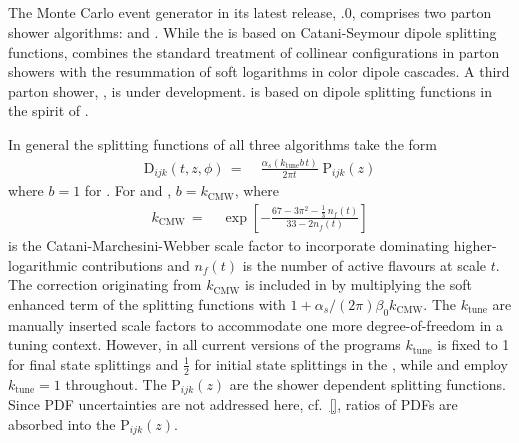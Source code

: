 \subsection{\Sherpa}
\label{sec:psunc:tools:sherpa}

The \Sherpa Monte Carlo event generator \cite{Gleisberg:2008ta} in its latest
release, .0, comprises two parton shower algorithms: \CSS
\cite{Schumann:2007mg} and \Dire \cite{Hoche:2015sya}. While the \CSS is based on
Catani-Seymour \cite{Catani:1996vz,Catani:2002hc} dipole splitting functions,
\Dire combines the standard treatment of collinear configurations in parton
showers with the resummation of soft logarithms in color dipole cascades. A
third parton shower, \Ants \cite{ants}, is under development. \Ants is based on
dipole splitting functions in the spirit of
\cite{Winter:2007ye,Lonnblad:1992tz}.

In general the splitting functions of all three algorithms take the 
form 
\begin{equation}
  \begin{split}\label{eq:psunc:tools:sherpa:sf}
    \mathrm{D}_{ijk}(t,z,\phi)
    \,=\;& \frac{\alpha_s(k_\text{tune}b\,t)}{2\pi t}\;\mathrm{P}_{ijk}(z)
  \end{split}
\end{equation}
where $b=1$ for \Dire. For \CSS and \Ants, $b=k_\text{CMW}$, where
\begin{equation}
  \begin{split}\label{eq:psunc:tools:sherpa:kcmw}
    k_\text{CMW}
    \,=\;&\exp\left[-\frac{67-3\pi^2-\tfrac{1}{3}\,n_f(t)}{33-2n_f(t)}\right]
  \end{split}
\end{equation}
is the Catani-Marchesini-Webber scale factor \cite{Catani:1990rr}
to incorporate dominating higher-logarithmic contributions and $n_f(t)$ 
is the number of active flavours at scale $t$. The correction originating from
$k_\text{CMW}$ is included in \Dire by multiplying the soft enhanced term of the
splitting functions with $1+\alpha_s/(2\pi)\beta_0k_\text{CMW}$. The $k_\text{tune}$ 
are manually inserted scale factors to accommodate one more degree-of-freedom 
in a tuning context. However, in all current versions of the programs 
$k_\text{tune}$ is fixed to 1 for final state splittings and $\tfrac{1}{2}$ 
for initial state splittings in the \CSS, while \Ants and \Dire employ 
$k_\text{tune}=1$ throughout. The $\mathrm{P}_{ijk}(z)$ are the shower 
dependent splitting functions. 
Since PDF uncertainties are not addressed here, cf.\ \ref{}, ratios of 
PDFs are absorbed into the $\mathrm{P}_{ijk}(z)$.

